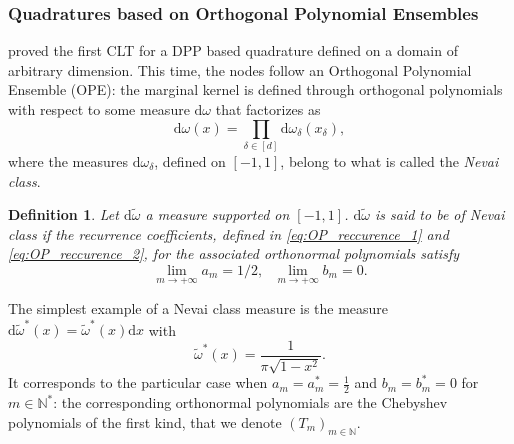 \documentclass[twoside,11pt]{book}
\newtheorem{definition}{Definition}
\numberwithin{theorem}{chapter}
\numberwithin{definition}{chapter}
\numberwithin{proposition}{chapter}
\numberwithin{corollary}{chapter}
\numberwithin{example}{chapter}
\numberwithin{lemma}{chapter}
\numberwithin{assumption}{chapter}
\begin{document}
\subsubsection{Quadratures based on Orthogonal Polynomial Ensembles}
\cite{BaHa16} proved the first CLT for a DPP based quadrature defined on a domain of arbitrary dimension. This time, the nodes follow an Orthogonal Polynomial Ensemble (OPE): the marginal kernel is  defined through orthogonal polynomials with respect to some measure $\mathrm{d}\omega$ that factorizes as
\begin{equation}
\mathrm{d}\omega(x) = \prod\limits_{\delta \in [d]} \mathrm{d}\omega_{\delta}(x_{\delta}),
\end{equation}
where the measures $\mathrm{d}\omega_{\delta}$, defined on $[-1,1]$, belong to what is called the \emph{Nevai class}. 
\begin{definition}
Let $\mathrm{d}\tilde{\omega}$ a measure supported on $[-1,1]$. $\mathrm{d}\tilde{\omega}$ is said to be of Nevai class if 
the recurrence coefficients, defined in \eqref{eq:OP_reccurence_1} and \eqref{eq:OP_reccurence_2}, for
the associated orthonormal polynomials satisfy
\begin{equation}
\lim\limits_{m \rightarrow +\infty} a_{m} = 1/2, \:\:\: \lim\limits_{m \rightarrow +\infty} b_{m} = 0.
\end{equation}
\end{definition}
The simplest example of a Nevai class measure is the measure $\mathrm{d}\tilde{\omega}^{*}(x) = \tilde{\omega}^{*}(x) \mathrm{d}x$ with 
\begin{equation}\label{eq:omega_star}
\tilde{\omega}^{*}(x) = \frac{1}{\pi\sqrt{1-x^{2}}}.
\end{equation}
It corresponds to the particular case when $a_{m} = a^{*}_{m} = \frac{1}{2}$ and $b_m =  b^{*}_{m} =0$ for $m \in \mathbb{N}^{*}$: the corresponding orthonormal polynomials are the Chebyshev polynomials of the first kind, that we denote $(T_{m})_{m \in \mathbb{N}}$.
\end{document}
